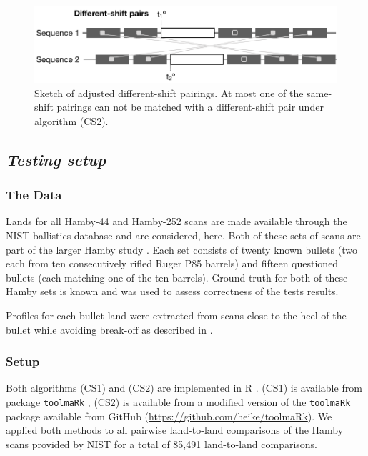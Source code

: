 \documentclass[12pt]{article}
\begin{document}
\begin{figure}[hbtp]
\centering
\includegraphics[width=.7\textwidth]{images/sketch-diff-2.png}
\caption{\label{sketch-diff-2}Sketch of adjusted different-shift pairings. At most one of the same-shift pairings can not be matched with a different-shift pair under algorithm (CS2). }
\end{figure}

\hypertarget{testing-setup}{%
\subsection*{\texorpdfstring{\emph{Testing
setup}}{Testing setup}}\label{testing-setup}}

\hypertarget{the-data}{%
\subsubsection*{The Data}\label{the-data}}

Lands for all Hamby-44 and Hamby-252 scans are made available through
the NIST ballistics database \citep{nist} and are considered, here. Both
of these sets of scans are part of the larger Hamby study \citep{hamby}.
Each set consists of twenty known bullets (two each from ten
consecutively rifled Ruger P85 barrels) and fifteen questioned bullets
(each matching one of the ten barrels). Ground truth for both of these
Hamby sets is known and was used to assess correctness of the tests
results.

Profiles for each bullet land were extracted from scans close to the
heel of the bullet while avoiding break-off as described in
\citet{aoas}.

\hypertarget{setup}{%
\subsubsection*{Setup}\label{setup}}

Both algorithms (CS1) and (CS2) are implemented in R \citep{R}. (CS1) is
available from package \texttt{toolmaRk} \citep{toolmark}, (CS2) is
available from a modified version of the \texttt{toolmaRk} package
available from GitHub (\url{https://github.com/heike/toolmaRk}). We
applied both methods to all pairwise land-to-land comparisons of the
Hamby scans provided by NIST for a total of 85,491 land-to-land
comparisons.
\end{document}
